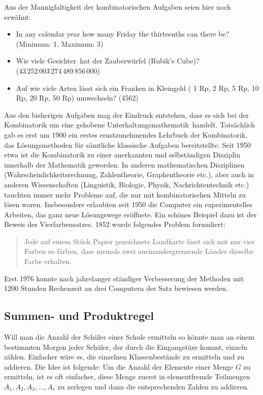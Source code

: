 \documentclass[%
11pt,%
twoside,%
titlepage,%
german,%
headsepline%
]{scrartcl}
\newcounter{theo}[section]\setcounter{theo}{0}
\begin{document}
 Aus der Mannigfaltigkeit der kombinatorischen Aufgaben seien hier noch erwähnt:
 \begin{itemize}
 \item In any calendar year how many Friday the thirteenths can there be? (Minimum: 1, Maximum: 3)
 \item Wie viele \glqq Gesichter\grqq\ hat der Zauberwürfel (Rubik's Cube)?\\ ($43\,252\,003\,274\,489\,856\,000$)
 \item Auf wie viele Arten lässt sich ein Franken in Kleingeld ( 1 Rp, 2 Rp, 5 Rp, 10 Rp, 20 Rp, 50 Rp) umwechseln? (4562)
 \end{itemize}
 
 Aus den bisherigen Aufgaben mag der Eindruck entstehen, dass es sich bei der Kombinatorik um eine \glqq gehobene Unterhaltungsmathematik\grqq\ handelt. Tatsächlich gab es erst um 1900 ein erstes ernstzunehmendes Lehrbuch der Kombinatorik, das Lösungsmethoden für sämtliche klassische Aufgaben bereitstellte. Seit 1950 etwa ist die Kombinatorik zu einer anerkannten und selbständigen Disziplin innerhalb der Mathematik geworden. In anderen mathematischen Disziplinen (Wahrscheinlichkeitsrechnung, Zahlentheorie, Graphentheorie etc.), aber auch in anderen Wissenschaften (Linguistik, Biologie, Physik, Nachrichtentechnik etc.) tauchten immer mehr Probleme auf, die nur mit kombinatorischen Mitteln zu lösen waren. Insbesondere erlaubten seit 1950 die Computer ein experimentelles Arbeiten, das ganz neue Lösungswege eröffnete. Ein schönes Beispiel dazu ist der Beweis des Vierfarbensatzes. 1852 wurde folgendes Problem formuliert:
 \begin{quote}
 Jede auf einem Stück Papier gezeichnete Landkarte lässt sich mit nur vier Farben so färben, dass niemals zwei aneinandergrenzende Länder dieselbe Farbe erhalten.
 \end{quote}
Erst 1976 konnte nach jahrelanger ständiger Verbesserung der Methoden mit 1200 Stunden Rechenzeit an drei Computern der Satz bewiesen werden.

\subsection{Summen- und Produktregel}
Will man die Anzahl der Schüler einer Schule ermitteln so könnte man an einem bestimmten Morgen jeder Schüler, der durch die Eingangstüre kommt, einzeln zählen. Einfacher wäre es, die einzelnen Klassenbestände zu ermitteln und zu addieren.
Die Idee ist folgende: Um die Anzahl der Elemente einer Menge $G$ zu ermitteln, ist es oft einfacher, diese Menge zuerst in elementfremde Teilmengen $A_1, A_2, A_3, \dots, A_r$ zu zerlegen und dann die entsprechenden Zahlen zu addieren.
\end{document}

